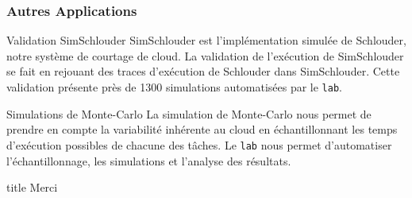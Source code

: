 \documentclass{beamer}
\newcommand{\lab}{\texttt{lab}}
\begin{document}
\begin{frame}
	\frametitle{Autres Applications}
	\begin{block}{Validation SimSchlouder}
		SimSchlouder est l'implémentation simulée de Schlouder, notre
		système de courtage de cloud. La validation de l'exécution de
		SimSchlouder se fait en rejouant des traces d'exécution de
		Schlouder dans SimSchlouder. Cette validation présente près de
		1300 simulations automatisées par le \lab.
	\end{block}
	\begin{block}{Simulations de Monte-Carlo}
		La simulation de Monte-Carlo nous permet de prendre en compte la
		variabilité inhérente au cloud en échantillonnant les temps
		d'exécution possibles de chacune des tâches. Le \lab{} nous 
		permet d'automatiser l'échantillonnage, les simulations et 
		l'analyse des résultats.
	\end{block}
\end{frame}

\begin{frame}
	\begin{beamercolorbox}[sep=8pt,center,shadow=true,rounded=true]{title}
		Merci\par
	\end{beamercolorbox}
\end{frame}
\end{document}

